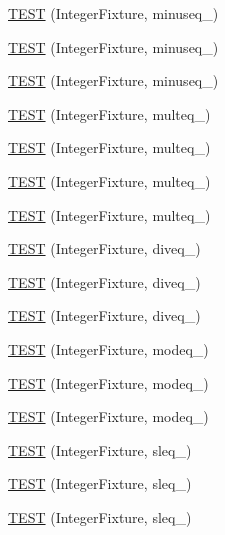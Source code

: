 \begin{DoxyCompactItemize}
\item 
\hyperlink{bmk447-TestInteger_8c_09_09_a6d5b55fb86b2d1c05eeacec27f29c532}{T\-E\-S\-T} (Integer\-Fixture, minuseq\-\_)
\item 
\hyperlink{bmk447-TestInteger_8c_09_09_a02e4a6e3e6d34ee3b192df58b5b42d9c}{T\-E\-S\-T} (Integer\-Fixture, minuseq\-\_)
\item 
\hyperlink{bmk447-TestInteger_8c_09_09_a05fdbf6bfcdec7074489fd9112ebce85}{T\-E\-S\-T} (Integer\-Fixture, minuseq\-\_)
\item 
\hyperlink{bmk447-TestInteger_8c_09_09_ab797996dbd77bbeb3883de3ae9352215}{T\-E\-S\-T} (Integer\-Fixture, multeq\-\_)
\item 
\hyperlink{bmk447-TestInteger_8c_09_09_aaec7a8c5b5d5d3f506b2e20dc53ce05e}{T\-E\-S\-T} (Integer\-Fixture, multeq\-\_)
\item 
\hyperlink{bmk447-TestInteger_8c_09_09_ac8de447f23e241d050b20360abc7cf50}{T\-E\-S\-T} (Integer\-Fixture, multeq\-\_)
\item 
\hyperlink{bmk447-TestInteger_8c_09_09_a61af0983b3080ac7d057f52046451bac}{T\-E\-S\-T} (Integer\-Fixture, multeq\-\_)
\item 
\hyperlink{bmk447-TestInteger_8c_09_09_a7cbb51b7a0ff179cf394cd2896fb622f}{T\-E\-S\-T} (Integer\-Fixture, diveq\-\_)
\item 
\hyperlink{bmk447-TestInteger_8c_09_09_a4d4f38163ebfefe14e83ec1ed18bb238}{T\-E\-S\-T} (Integer\-Fixture, diveq\-\_)
\item 
\hyperlink{bmk447-TestInteger_8c_09_09_a553313669ed235bced7659d9fde90295}{T\-E\-S\-T} (Integer\-Fixture, diveq\-\_)
\item 
\hyperlink{bmk447-TestInteger_8c_09_09_a5066e6742dbdc5eacdb820f0964a4533}{T\-E\-S\-T} (Integer\-Fixture, modeq\-\_)
\item 
\hyperlink{bmk447-TestInteger_8c_09_09_aa7cccd88c4ccb4bcd770aedd21d9c74f}{T\-E\-S\-T} (Integer\-Fixture, modeq\-\_)
\item 
\hyperlink{bmk447-TestInteger_8c_09_09_a411b790103257c77729613127fc8b8b4}{T\-E\-S\-T} (Integer\-Fixture, modeq\-\_)
\item 
\hyperlink{bmk447-TestInteger_8c_09_09_a03266ab5bdfac3580e382a72cdef3a9e}{T\-E\-S\-T} (Integer\-Fixture, sleq\-\_)
\item 
\hyperlink{bmk447-TestInteger_8c_09_09_a19c58ea53e09b27130c71132a9c17e4b}{T\-E\-S\-T} (Integer\-Fixture, sleq\-\_)
\item 
\hyperlink{bmk447-TestInteger_8c_09_09_a74e91182d918dfae7d839ff30acd5770}{T\-E\-S\-T} (Integer\-Fixture, sleq\-\_)

\end{DoxyCompactItemize}
